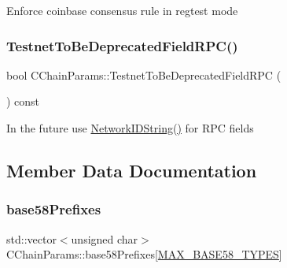 Enforce coinbase consensus rule in regtest mode \mbox{\label{class_c_chain_params_a1552cea0636112ef84069cd6b7858b8e}} 
\subsubsection{\texorpdfstring{Testnet\+To\+Be\+Deprecated\+Field\+R\+P\+C()}{TestnetToBeDeprecatedFieldRPC()}}
{\footnotesize\ttfamily bool C\+Chain\+Params\+::\+Testnet\+To\+Be\+Deprecated\+Field\+R\+PC (\begin{DoxyParamCaption}{ }\end{DoxyParamCaption}) const\hspace{0.3cm}{\ttfamily [inline]}}

In the future use \mbox{\hyperlink{class_c_chain_params_a2c02cc73f7fe9369cee9a39a0fd5b710}{Network\+I\+D\+String()}} for R\+PC fields 

\subsection{Member Data Documentation}
\mbox{\label{class_c_chain_params_a923d956c5d3891d0c682b7ef5410ed8f}} 
\subsubsection{\texorpdfstring{base58\+Prefixes}{base58Prefixes}}
{\footnotesize\ttfamily std\+::vector$<$unsigned char$>$ C\+Chain\+Params\+::base58\+Prefixes\mbox{[}\mbox{\hyperlink{class_c_chain_params_aa294058ec2e3586bd8d03d6c39667058a6b21a525c7fab64a5df656e708f71a98}{M\+A\+X\+\_\+\+B\+A\+S\+E58\+\_\+\+T\+Y\+P\+ES}}\mbox{]}\hspace{0.3cm}{\ttfamily [protected]}}

\mbox{\label{class_c_chain_params_ac66ed599d7795bd17a504539a960f9de}} 
